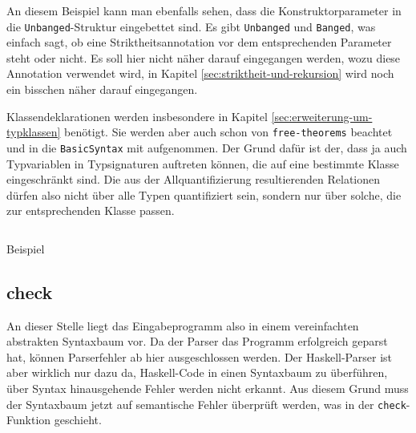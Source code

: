 An diesem Beispiel kann man ebenfalls sehen, dass die Konstruktorparameter in die \texttt{Unbanged}-Struktur eingebettet sind.
Es gibt \texttt{Unbanged} und \texttt{Banged}, was einfach sagt, ob eine Striktheitsannotation vor dem entsprechenden
Parameter steht oder nicht. Es soll hier nicht näher darauf eingegangen werden, wozu diese Annotation verwendet wird, in
Kapitel \ref{sec:striktheit-und-rekursion} wird noch ein bisschen näher darauf eingegangen.

Klassendeklarationen werden insbesondere in Kapitel \ref{sec:erweiterung-um-typklassen} benötigt. Sie werden aber auch schon
von \texttt{free-theorems} beachtet und in die \texttt{BasicSyntax} mit aufgenommen. Der Grund dafür ist der, dass ja auch
Typvariablen in Typsignaturen auftreten können, die auf eine bestimmte Klasse eingeschränkt sind. Die aus der Allquantifizierung
resultierenden Relationen dürfen also nicht über alle Typen quantifiziert sein, sondern nur über solche, die zur entsprechenden
Klasse passen.


\begin{listing}[ht]
\inputminted[tabsize=2]{haskell}{ast2.hs}
\caption{Beispiel}
\label{lst:ast-data}
\end{listing}


\subsection{check}

\label{sec:check}

An dieser Stelle liegt das Eingabeprogramm also in einem vereinfachten abstrakten Syntaxbaum vor. Da der Parser das Programm
erfolgreich geparst hat, können Parserfehler ab hier ausgeschlossen werden. Der Haskell-Parser ist aber wirklich nur dazu da,
Haskell-Code in einen Syntaxbaum zu überführen, über Syntax hinausgehende Fehler werden nicht erkannt. Aus diesem Grund
muss der Syntaxbaum jetzt auf semantische Fehler überprüft werden, was in der \texttt{check}-Funktion geschieht.

